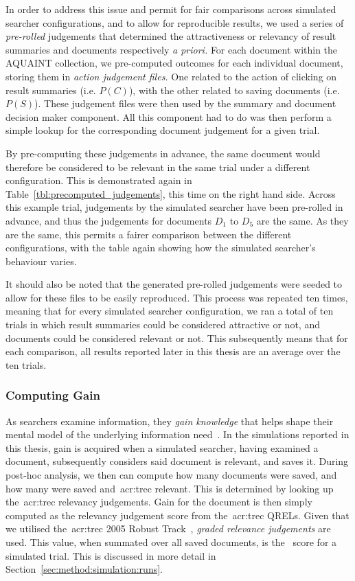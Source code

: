 In order to address this issue and permit for fair comparisons across simulated searcher configurations, and to allow for reproducible results, we used a series of \emph{pre-rolled} judgements that determined the attractiveness or relevancy of result summaries and documents respectively \emph{a priori.} For each document within the AQUAINT collection, we pre-computed outcomes for each individual document, storing them in \emph{action judgement files.} One related to the action of clicking on result summaries (i.e. $P(C)$), with the other related to saving documents (i.e. $P(S)$). These judgement files were then used by the summary and document decision maker component. All this component had to do was then perform a simple lookup for the corresponding document judgement for a given trial.

By pre-computing these judgements in advance, the same document would therefore be considered to be relevant in the same trial under a different configuration. This is demonstrated again in Table~\ref{tbl:precomputed_judgements}, this time on the right hand side. Across this example trial, judgements by the simulated searcher have been pre-rolled in advance, and thus the judgements for documents $D_1$ to $D_5$ are the same. As they are the same, this permits a fairer comparison between the different configurations, with the table again showing how the simulated searcher's behaviour varies.

It should also be noted that the generated pre-rolled judgements were seeded to allow for these files to be easily reproduced. This process was repeated ten times, meaning that for every simulated searcher configuration, we ran a total of ten trials in which result summaries could be considered attractive or not, and documents could be considered relevant or not. This subsequently means that for each comparison, all results reported later in this thesis are an average over the ten trials.

\subsubsection{Computing Gain}\label{sec:method:simulation:grounding:gain}
As searchers examine information, they \emph{gain knowledge} that helps shape their mental model of the underlying information need~\citep{nickles1995judgment}. In the simulations reported in this thesis, gain is acquired when a simulated searcher, having examined a document, subsequently considers said document is relevant, and saves it. During post-hoc analysis, we then can compute how many documents were saved, and how many were saved and~\gls{acr:trec} relevant. This is determined by looking up the~\gls{acr:trec} relevancy judgements. Gain for the document is then simply computed as the relevancy judgement score from the~\gls{acr:trec} QRELs. Given that we utilised the~\gls{acr:trec} 2005 Robust Track~\citep{voorhees2005trec_book}, \emph{graded relevance judgements} are used. This value, when summated over all saved documents, is the~ score for a simulated trial. This is discussed in more detail in Section~\ref{sec:method:simulation:runs}.

